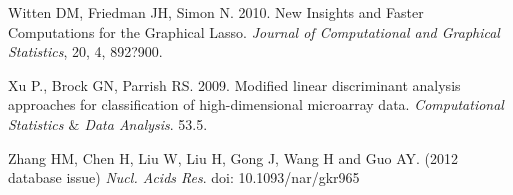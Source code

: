 \begin{thebibliography}{9}
Witten DM,  Friedman JH, Simon N. 2010.
New Insights and Faster Computations for the Graphical Lasso. 
\textit{Journal of Computational and Graphical Statistics}, 20, 4, 892?900.

Xu P.,  Brock GN,  Parrish RS.  2009.
Modified linear discriminant analysis approaches for classification of high-dimensional microarray data.
\textit{Computational Statistics $\&$ Data Analysis}. 53.5.

Zhang HM, Chen H, Liu W, Liu H, Gong J, Wang H and Guo AY. (2012 database issue)
\textit{Nucl. Acids Res}. doi: 10.1093/nar/gkr965

\end{thebibliography}



